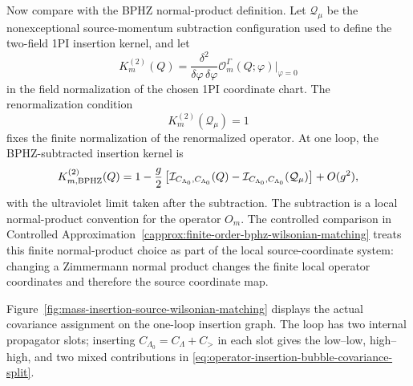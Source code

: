 Now compare with the BPHZ normal-product definition.  Let
\(\mathcal Q_\mu\) be the nonexceptional source-momentum subtraction
configuration used to define the two-field 1PI insertion kernel, and let
\[
  K_m^{(2)}(Q)
  =
  \frac{\delta^2}{\delta\varphi\,\delta\varphi}
  \mathcal O_m^\Gamma(Q;\varphi)
  \bigg|_{\varphi=0}
\]
in the field normalization of the chosen 1PI coordinate chart.  The
renormalization condition
\[
  K_m^{(2)}(\mathcal Q_\mu)=1
\]
fixes the finite normalization of the renormalized operator.  At one loop,
the BPHZ-subtracted insertion kernel is
\begin{equation}
  K_{m,{\rm BPHZ}}^{(2)}(Q)
  =
  1
  -
  \frac{g}{2}
  \left[
    \mathcal I_{C_{\Lambda_0},C_{\Lambda_0}}(Q)
    -
    \mathcal I_{C_{\Lambda_0},C_{\Lambda_0}}(\mathcal Q_\mu)
  \right]
  +
  O(g^2),
  \label{eq:bphz-mass-insertion-normal-product}
\end{equation}
with the ultraviolet limit taken after the subtraction.  The subtraction is a
local normal-product convention for the operator \(O_m\).
The controlled comparison in
Controlled Approximation~\ref{capprox:finite-order-bphz-wilsonian-matching}
treats this finite
normal-product choice as part of the local source-coordinate system: changing a
Zimmermann normal product changes the finite local operator coordinates and
therefore the source coordinate map.

Figure~\ref{fig:mass-insertion-source-wilsonian-matching} displays the
actual covariance assignment on the one-loop insertion graph.  The loop has
two internal propagator slots; inserting
\(C_{\Lambda_0}=C_\Lambda+C_>\) in each slot gives the low--low,
high--high, and two mixed contributions in
\eqref{eq:operator-insertion-bubble-covariance-split}.


